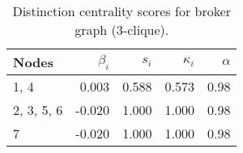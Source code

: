 \begin{table}
\centering
\caption{\label{tab:b3}Distinction centrality scores for broker graph (3-clique).}
\centering
\begin{tabular}[t]{lrrrr}
\toprule
Nodes & $\beta_i$ & $s_i$ & $\kappa_i$ & $\alpha$\\
\midrule
1, 4 & 0.003 & 0.588 & 0.573 & 0.98\\
2, 3, 5, 6 & -0.020 & 1.000 & 1.000 & 0.98\\
7 & -0.020 & 1.000 & 1.000 & 0.98\\
\bottomrule
\end{tabular}
\end{table}
